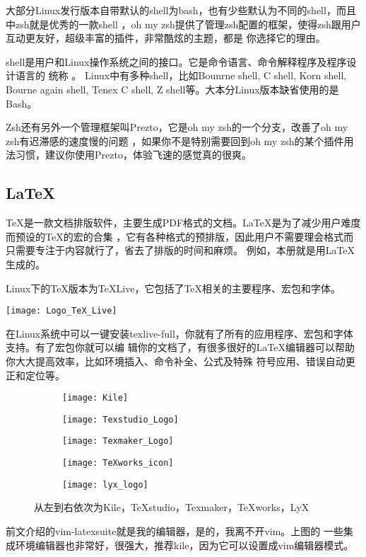 \documentclass[11pt,fleqn]{book} %
\begin{document}
大部分Linux发行版本自带默认的shell为bash，也有少些默认为不同的shell，而且中zsh就是优秀的一款shell
，oh my zsh提供了管理zsh配置的框架，使得zsh跟用户互动更友好，超级丰富的插件，非常酷炫的主题，都是
你选择它的理由。
\begin{tips}
  shell是用户和Linux操作系统之间的接口。它是命令语言、命令解释程序及程序设计语言的
  统称 。 Linux中有多种shell，比如Bounrne shell, C shell, Korn shell, Bourne again shell, 
  Tenex C shell, Z shell等。大本分Linux版本缺省使用的是Bash。
\end{tips}
\begin{notation}
  Zsh还有另外一个管理框架叫Prezto，它是oh my zsh的一个分支，改善了oh my zsh有迟滞感的速度慢的问题
  ，如果你不是特别需要回到oh my zsh的某个插件用法习惯，建议你使用Prezto，体验飞速的感觉真的很爽。
\end{notation}
\subsection{\LaTeX}\index{\LaTeX}
\TeX 是一款文档排版软件，主要生成PDF格式的文档。\LaTeX 是为了减少用户难度而预设的\TeX 的宏的合集
，它有各种格式的预排版，因此用户不需要理会格式而只需要专注于内容就行了，省去了排版的时间和麻烦。
例如，本册就是用\LaTeX 生成的。

Linux下的\TeX 版本为\TeX Live，它包括了\TeX 相关的主要程序、宏包和字体。
\begin{center}
  \texttt{[image: Logo\_TeX\_Live]}
\end{center}
在Linux系统中可以一键安装texlive-full，你就有了所有的应用程序、宏包和字体支持。有了宏包你就可以编
辑你的文档了，有很多很好的\LaTeX 编辑器可以帮助你大大提高效率，比如环境插入、命令补全、公式及特殊
符号应用、错误自动更正和定位等。
\begin{figure}[!h]
  \begin{subfigure}{0.19\textwidth}
    \texttt{[image: Kile]}
  \end{subfigure}
  \begin{subfigure}{0.19\textwidth}
    \texttt{[image: Texstudio\_Logo]}
  \end{subfigure}
  \begin{subfigure}{0.18\textwidth}
    \texttt{[image: Texmaker\_Logo]}
  \end{subfigure}
  \begin{subfigure}{0.20\textwidth}
    \texttt{[image: TeXworks\_icon]}
  \end{subfigure}
  \begin{subfigure}{0.20\textwidth}
    \texttt{[image: lyx\_logo]}
  \end{subfigure}
  \caption{从左到右依次为Kile，TeXstudio，Texmaker，TeXworks，LyX}
\end{figure}
前文介绍的vim-latexsuite就是我的编辑器，是的，我离不开vim。上图的
一些集成环境编辑器也非常好，很强大，推荐kile，因为它可以设置成vim编辑器模式。
\end{document}
